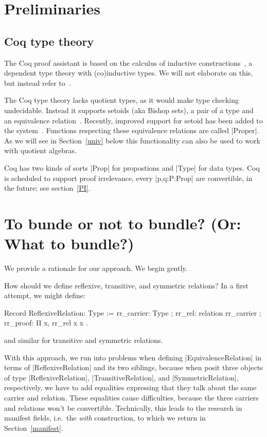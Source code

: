 \documentclass[a4paper,10pt,runningheads]{llncs}
\begin{document}
\section{Preliminaries}
\subsection{Coq type theory}
The Coq proof assistant is based on the calculus of inductive
constructions~\cite{CoquandHuet,CoquandPaulin}, a dependent type theory with (co)inductive types.
We will not elaborate on this, but instead refer to~\cite{Coq,BC04}.

The Coq type theory lacks quotient
types, as it would make type checking undecidable. Instead it
supports setoids (aka Bishop sets), a pair of a type and an equivalence
relation~\cite{Bishop67,Hofmann,Capretta}. Recently, improved support for setoid has been added to
the system~\cite{Setoid-rewrite}. Functions respecting these equivalence relations are called
|Proper|.
As we will see in Section~\ref{univ} below this functionality can also be used to work with
quotient algebras.

Coq has two kinds of sorts |Prop| for propostions and |Type| for data types. Coq
is scheduled to support proof irrelevance, every |p,q:P:Prop| are
convertible, in the future; see section~\ref{PI}.


\section{To bunde or not to bundle? (Or: What to bundle?)}
We provide a rationale for our approach. We begin gently.

How should we define reflexive, transitive, and symmetric relations? In a first attempt, we
might define:
\begin{code}
  Record ReflexiveRelation: Type :=
    { rr_carrier: Type
    ; rr_rel: relation rr_carrier
    ; rr_proof: Π x, rr_rel x x }.
\end{code}
and similar for transitive and symmetric relations.

With this approach, we run into problems when defining |EquivalenceRelation| in terms of
|ReflexiveRelation| and its two siblings, because when posit three objects of type
|ReflexiveRelation|, |TransitiveRelation|, and |SymmetricRelation|, respectively, we have to
add equalities expressing that they talk about the same carrier and relation. These equalities
cause difficulties, because the three carriers and relations won't be convertible.
Technically, this leads to the research in manifest fields, i.e.\ the \emph{with} construction, to
which
we return in Section~\ref{manifest}.
\end{document}
